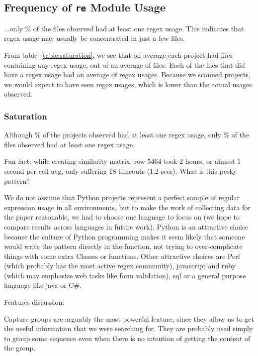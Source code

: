 \subsection{Frequency of {\tt re} Module Usage}
...only \% of the files observed had at least one regex usage.  This indicates that regex usage may usually be concentrated in just a few files.


From table~\ref{table:saturation}, we see that on average each project had  files containing any regex usage, out of an average of  files.  Each of the files that did have a regex usage had an average of  regex usages.  Because we scanned  projects, we would expect to have seen  regex usages, which is lower than the actual  usages observed.
\subsubsection{Saturation}Although \% of the projects observed had at least one regex usage, only \% of the files observed had at least one regex usage.



Fun fact: while creating similarity matrix, row 5464 took 2 hours, or almost 1 second per cell avg, only suffering 18 timeouts (1.2 secs).  What is this pesky pattern?

We do not assume that Python projects represent a perfect sample of regular expression usage in all environments, but to make the work of collecting data for the paper reasonable, we had to choose one language to focus on (we hope to compare results across languages in future work).  Python is an attractive choice because the culture of Python programming makes it seem likely that someone would write the pattern directly in the function, not trying to over-complicate things with some extra Classes or functions.  Other attractive choices are Perl (which probably has the most active regex community), javascript and ruby (which may emphasize web tasks like form validation), sql or a general purpose language like java or C\#.

Features discussion:

Capture groups are arguably the most powerful feature, since they allow us to get the useful information that we were searching for.  They are probably used simply to group some sequence even when there is no intention of getting the content of the group.

